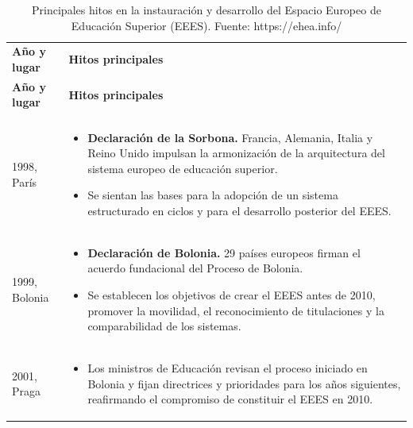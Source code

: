 \documentclass[
  11pt,
  a4paper,
  twoside]{scrreprt}
\begin{document}
\begin{longtable}{p{3cm} p{11.5cm}}

\caption{\label{tbl-EEES}Principales hitos en la instauración y
desarrollo del Espacio Europeo de Educación Superior (EEES). Fuente:
https://ehea.info/}

\tabularnewline

\rowcolors{2}{lightgray}{white}
 \\
\toprule
\textbf{Año y lugar} & \textbf{Hitos principales} \\
\midrule
\endfirsthead

\hline
\textbf{Año y lugar} & \textbf{Hitos principales} \\
\hline
\endhead

\hline
\endfoot

\hline
\multicolumn{2}{r}{\textit{Continúa en la página siguiente}} \\
\endfoot

\hline
\endlastfoot

1998, París &
\begin{itemize}
\item \textbf{Declaración de la Sorbona.} Francia, Alemania, Italia y Reino Unido impulsan la armonización de la arquitectura del sistema europeo de educación superior.
\item Se sientan las bases para la adopción de un sistema estructurado en ciclos y para el desarrollo posterior del EEES.
\end{itemize}
\\ \hline

1999, Bolonia &
\begin{itemize}
\item \textbf{Declaración de Bolonia.} 29 países europeos firman el acuerdo fundacional del Proceso de Bolonia.
\item Se establecen los objetivos de crear el EEES antes de 2010, promover la movilidad, el reconocimiento de titulaciones y la comparabilidad de los sistemas.
\end{itemize}
\\ \hline

2001, Praga &
\begin{itemize}
\item Los ministros de Educación revisan el proceso iniciado en Bolonia y fijan directrices y prioridades para los años siguientes, reafirmando el compromiso de constituir el EEES en 2010.
\end{itemize}
\\ \hline


\end{longtable}
\end{document}
